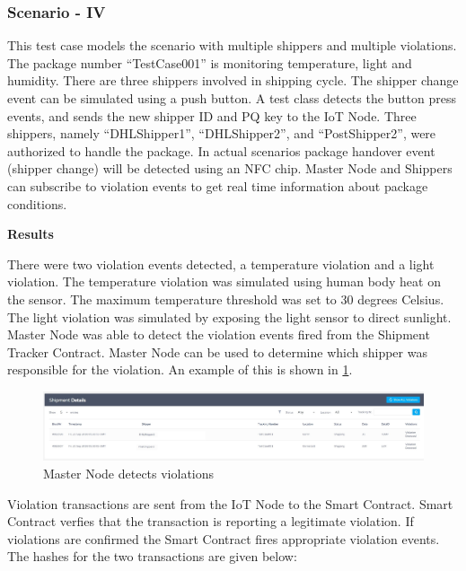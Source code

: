 \subsubsection{Scenario - IV} \label{viol1} 
This test case models the scenario with multiple shippers and multiple violations. The package number “TestCase001” is monitoring temperature, light and humidity. There are three shippers involved in shipping cycle. The shipper change event can be simulated using a push button. A test class detects the button press events, and sends the new shipper ID and PQ key to the IoT Node.  Three shippers, namely “DHLShipper1”, “DHLShipper2”, and “PostShipper2”, were authorized to handle the package. In actual scenarios package handover event (shipper change) will be detected using an NFC chip.  Master Node and Shippers can subscribe to violation events to get real time information about package conditions.

\textbf{Results}

There were two violation events detected, a temperature violation and a light violation. The temperature violation was simulated using human body heat on the sensor. The maximum temperature threshold was set to 30 degrees Celsius. The light violation was simulated by exposing the light sensor to direct sunlight. Master Node was able to detect the violation events fired from the Shipment Tracker Contract. Master Node can be used to determine which shipper was responsible for the violation. An example of this is shown in \ref{fig:violationEvent}.
 
\begin{figure}[h]
	\centering
    \includegraphics[width=170mm,scale=1]{figs/violationEvent}
	\caption{Master Node detects violations}
	\label{fig:violationEvent} 
\end{figure}


Violation transactions are sent from the IoT Node to the Smart Contract. Smart Contract verfies that the transaction is reporting a legitimate violation. If violations are confirmed the Smart Contract fires appropriate violation events. The hashes for the two transactions are given below: %

